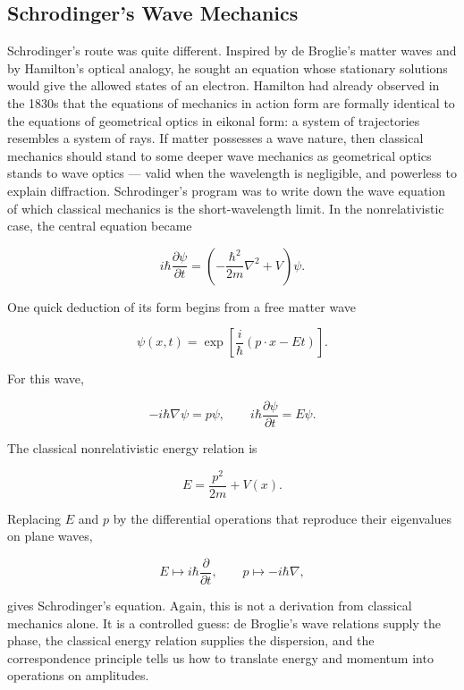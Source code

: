 \subsection{Schrodinger's Wave Mechanics}
Schrodinger's route was quite different. Inspired by de Broglie's matter waves and by Hamilton's optical analogy, he sought an equation whose stationary solutions would give the allowed states of an electron. Hamilton had already observed in the 1830s that the equations of mechanics in action form are formally identical to the equations of geometrical optics in eikonal form: a system of trajectories resembles a system of rays. If matter possesses a wave nature, then classical mechanics should stand to some deeper wave mechanics as geometrical optics stands to wave optics --- valid when the wavelength is negligible, and powerless to explain diffraction. Schrodinger's program was to write down the wave equation of which classical mechanics is the short-wavelength limit. In the nonrelativistic case, the central equation became
\begin{linenomath}
    \begin{equation}
        i\hbar\frac{\partial \psi}{\partial t}
        =
        \left(-\frac{\hbar^2}{2m}\nabla^2+V\right)\psi.
    \end{equation}
\end{linenomath}
One quick deduction of its form begins from a free matter wave
\begin{linenomath}
    \begin{equation}
        \psi(x,t)
        =
        \exp\left[\frac{i}{\hbar}(p\cdot x-Et)\right].
    \end{equation}
\end{linenomath}
For this wave,
\begin{linenomath}
    \begin{equation}
        -i\hbar\nabla\psi=p\psi,
        \qquad
        i\hbar\frac{\partial\psi}{\partial t}=E\psi.
    \end{equation}
\end{linenomath}
The classical nonrelativistic energy relation is
\begin{linenomath}
    \begin{equation}
        E=\frac{p^2}{2m}+V(x).
    \end{equation}
\end{linenomath}
Replacing $E$ and $p$ by the differential operations that reproduce their eigenvalues on plane waves,
\begin{linenomath}
    \begin{equation}
        E\mapsto i\hbar\frac{\partial}{\partial t},
        \qquad
        p\mapsto -i\hbar\nabla,
    \end{equation}
\end{linenomath}
gives Schrodinger's equation. Again, this is not a derivation from classical mechanics alone. It is a controlled guess: de Broglie's wave relations supply the phase, the classical energy relation supplies the dispersion, and the correspondence principle tells us how to translate energy and momentum into operations on amplitudes.

